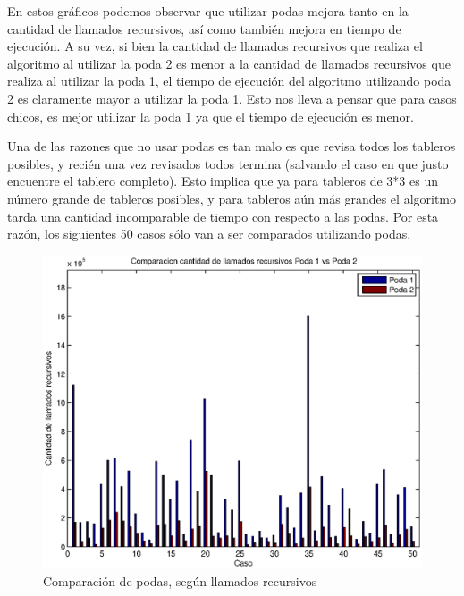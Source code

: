 En estos gráficos podemos observar que utilizar podas mejora tanto en la cantidad de llamados recursivos, así como también mejora en tiempo de ejecución. A su vez, si bien la cantidad de llamados recursivos que realiza el algoritmo al utilizar la poda 2 es menor a la cantidad de llamados recursivos que realiza al utilizar la poda 1, el tiempo de ejecución del algoritmo utilizando poda 2 es claramente mayor a utilizar la poda 1. Esto nos lleva a pensar que para casos chicos, es mejor utilizar la poda 1 ya que el tiempo de ejecución es menor.

Una de las razones que no usar podas es tan malo es que revisa todos los tableros posibles, y recién una vez revisados todos termina (salvando el caso en que justo encuentre el tablero completo). Esto implica que ya para tableros de 3*3 es un número grande de tableros posibles, y para tableros aún más grandes el algoritmo tarda una cantidad incomparable de tiempo con respecto a las podas. Por esta razón, los siguientes 50 casos sólo van a ser comparados utilizando podas.

\begin{center}
  \begin{figure}[H]
    \includegraphics[width=\linewidth]{problema3/graficos/comparacion_podas1y2_llamados_recursivos.eps}
    \caption{Comparación de podas, según llamados recursivos}
    \label{fig:problema3-podas-llamados}
  \end{figure}
\end{center}

